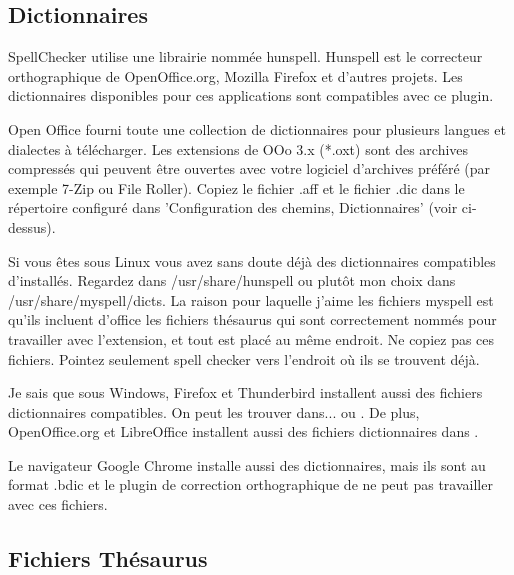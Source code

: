 
\subsection{Dictionnaires}

SpellChecker utilise une librairie nommée hunspell. Hunspell est le correcteur orthographique de OpenOffice.org, Mozilla Firefox et d'autres projets. Les dictionnaires disponibles pour ces applications sont compatibles avec ce plugin.

Open Office fourni toute une collection de dictionnaires pour plusieurs langues et dialectes à télécharger. Les extensions de OOo 3.x (*.oxt) sont des archives compressés qui peuvent être ouvertes avec votre logiciel d'archives préféré (par exemple 7-Zip ou File Roller). Copiez le fichier .aff et le fichier .dic dans le répertoire configuré dans 'Configuration des chemins, Dictionnaires' (voir ci-dessus).

Si vous êtes sous Linux vous avez sans doute déjà des dictionnaires compatibles d'installés. Regardez dans /usr/share/hunspell ou plutôt mon choix dans /usr/share/myspell/dicts. La raison pour laquelle j'aime les fichiers myspell est qu'ils incluent d'office les fichiers thésaurus qui sont correctement nommés pour travailler avec l'extension, et tout est placé au même endroit. Ne copiez pas ces fichiers. Pointez seulement spell checker vers l'endroit où ils se trouvent déjà.

Je sais que sous Windows, Firefox et Thunderbird installent aussi des fichiers dictionnaires compatibles. On peut les trouver dans...  ou . De plus, OpenOffice.org et LibreOffice installent aussi des fichiers dictionnaires dans\newline
 .

Le navigateur Google Chrome installe aussi des dictionnaires, mais ils sont au format .bdic et le plugin de correction orthographique de \codeblocks ne peut pas travailler avec ces fichiers.

\subsection{Fichiers Thésaurus}


